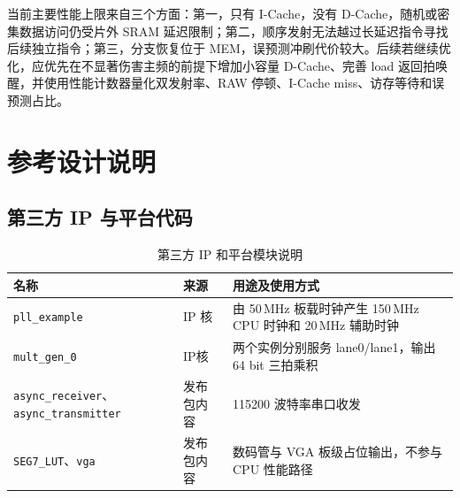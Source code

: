 \documentclass[UTF8,a4paper,zihao=5,fontset=none]{ctexart}
\newcommand{\code}[1]{\nolinkurl{#1}}
\begin{document}
当前主要性能上限来自三个方面：第一，只有 I-Cache，没有 D-Cache，随机或密集数据访问仍受片外 SRAM 延迟限制；第二，顺序发射无法越过长延迟指令寻找后续独立指令；第三，分支恢复位于 MEM，误预测冲刷代价较大。后续若继续优化，应优先在不显著伤害主频的前提下增加小容量 D-Cache、完善 load 返回拍唤醒，并使用性能计数器量化双发射率、RAW 停顿、I-Cache miss、访存等待和误预测占比。

\section{参考设计说明}

\subsection{第三方 IP 与平台代码}

\begin{table}[H]
  \centering
  \caption{第三方 IP 和平台模块说明}
  \begin{tabularx}{\textwidth}{p{3.6cm} p{3.4cm} X}
    \toprule
    名称                                             & 来源                              & 用途及使用方式                                        \\
    \midrule
    \code{pll_example}                             & IP 核      & 由 50\,MHz 板载时钟产生 150\,MHz CPU 时钟和 20\,MHz 辅助时钟 \\
    \code{mult_gen_0}                              & IP核 & 两个实例分别服务 lane0/lane1，输出 64 bit 三拍乘积            \\
    \code{async_receiver}、\code{async_transmitter} & 发布包内容                & 115200 波特率串口收发                                 \\
    \code{SEG7_LUT}、\code{vga}                     & 发布包内容                    & 数码管与 VGA 板级占位输出，不参与 CPU 性能路径                   \\
    \bottomrule
  \end{tabularx}
\end{table}

\end{document}
